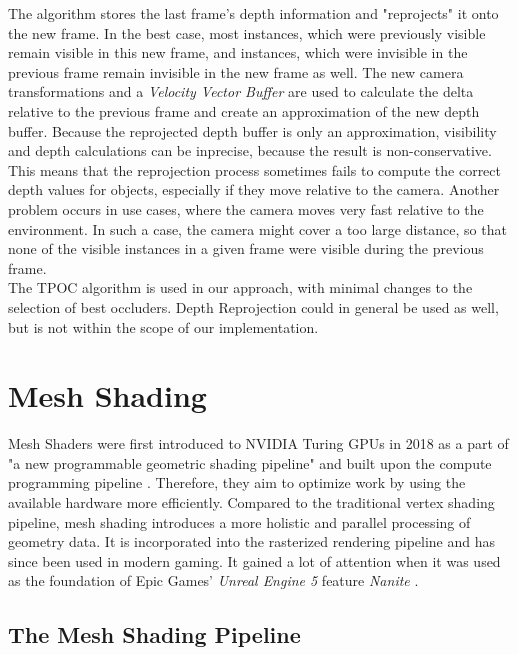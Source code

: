 \noindent
The algorithm stores the last frame's depth information and "reprojects" it onto the new frame. In the best case, 
most instances, which were previously visible remain visible in this new frame, and instances, which were invisible 
in the previous frame remain invisible in the new frame as well. The new camera transformations and a 
\emph{Velocity Vector Buffer} are used to calculate the delta relative to the previous frame and create an 
approximation of the new depth buffer. Because the reprojected depth buffer is only an approximation, visibility 
and depth calculations can be inprecise, because the result is non-conservative. This means that the reprojection 
process sometimes fails to compute the correct depth values for objects, especially if they move relative to the 
camera. Another problem occurs in use cases, where the camera moves very fast relative to the environment. In such 
a case, the camera might cover a too large distance, so that none of the visible instances in a given frame were 
visible during the previous frame. \cite{Kruskonja2022} \\

\noindent
The \ac{TPOC} algorithm is used in our approach, with minimal changes to the selection of best occluders.
Depth Reprojection could in general be used as well, but is not within the scope of our implementation.

\section{Mesh Shading}  \label{sec-mesh-shading}

Mesh Shaders were first introduced to NVIDIA Turing \ac{GPU}s in 2018 as a part of "a new programmable 
geometric shading pipeline" and built upon the compute programming pipeline \cite{Kubisch2018}. 
Therefore, they aim to optimize work by using the available hardware more efficiently. Compared to the 
traditional vertex shading pipeline, mesh shading introduces a more holistic and parallel processing of 
geometry data. It is incorporated into the rasterized rendering pipeline and has since been used in modern 
gaming. It gained a lot of attention when it was used as the foundation of Epic Games' \emph{Unreal Engine 5} 
feature \emph{Nanite} \cite{Karis2021}.\\

\subsection{The Mesh Shading Pipeline} \label{subsec-the-mesh-shading-pipeline}

